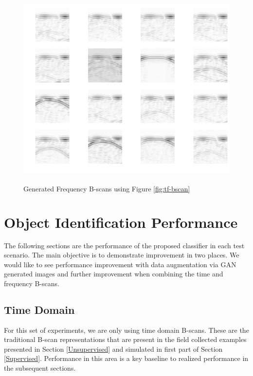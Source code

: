 \begin{figure}[H]
    \centering
    \includegraphics[width=\linewidth]{figures/freq_grid.png}
    \caption{\\Generated Frequency B-scans using Figure \ref{fig:tf-bscan}}
    \label{fig:freq_grid}
\end{figure}

\section{Object Identification Performance}
\hspace{0.5in}The following sections are the performance of the proposed classifier in each test scenario. The main objective is to demonstrate improvement in two places. We would like to see performance improvement with data augmentation via GAN generated images and further improvement when combining the time and frequency B-scans. 

\subsection{Time Domain}
\hspace{0.5in}For this set of experiments, we are only using time domain B-scans. These are the traditional B-scan representations that are present in the field collected examples presented in Section \ref{Unsupervised} and simulated in first part of Section \ref{Supervised}. Performance in this area is a key baseline to realized performance in the subsequent sections. 

